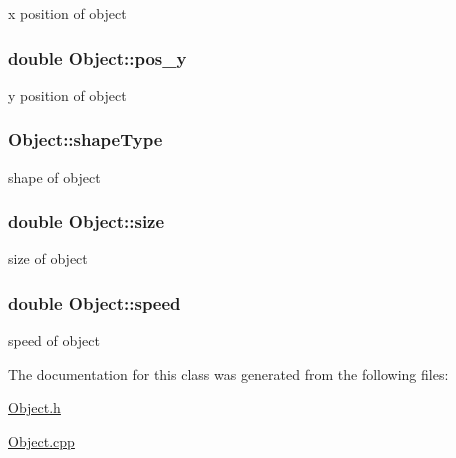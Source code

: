 x position of object \hypertarget{classObject_a986134c27f3e74ba41a4d28e20b183a9}{
\subsubsection[{pos\-\_\-y}]{\setlength{\rightskip}{0pt plus 5cm}double Object\-::pos\-\_\-y\hspace{0.3cm}{\ttfamily [private]}}}\label{classObject_a986134c27f3e74ba41a4d28e20b183a9}
y position of object \hypertarget{classObject_a9a991272a9e2ab2d05f963936386662e}{
\subsubsection[{shape\-Type}]{ Object\-::shape\-Type\hspace{0.3cm}{\ttfamily [private]}}}\label{classObject_a9a991272a9e2ab2d05f963936386662e}
shape of object \hypertarget{classObject_a61b87ea36899ba85231863f3c3bc55b3}{
\subsubsection[{size}]{\setlength{\rightskip}{0pt plus 5cm}double Object\-::size\hspace{0.3cm}{\ttfamily [private]}}}\label{classObject_a61b87ea36899ba85231863f3c3bc55b3}
size of object \hypertarget{classObject_ab452402c67c3bee95678cc8508be8034}{
\subsubsection[{speed}]{\setlength{\rightskip}{0pt plus 5cm}double Object\-::speed\hspace{0.3cm}{\ttfamily [private]}}}\label{classObject_ab452402c67c3bee95678cc8508be8034}
speed of object 

The documentation for this class was generated from the following files\-:\begin{DoxyCompactItemize}
\item 
\hyperlink{Object_8h}{Object.\-h}\item 
\hyperlink{Object_8cpp}{Object.\-cpp}\end{DoxyCompactItemize}
